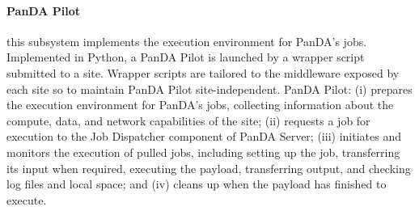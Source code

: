 
\paragraph{\textbf{PanDA Pilot}} this subsystem implements the execution
environment for PanDA's jobs\cite{nilsson2011atlas}. Implemented in Python, a
PanDA Pilot is launched by a wrapper script submitted to a site. Wrapper scripts
are tailored to the middleware exposed by each site so to maintain PanDA Pilot
site-independent. PanDA Pilot: (i) prepares the execution environment for
PanDA's jobs, collecting information about the compute, data, and network
capabilities of the site; (ii) requests a job for execution to the Job
Dispatcher component of PanDA Server; (iii) initiates and monitors the execution
of pulled jobs, including setting up the job, transferring its input when
required, executing the payload, transferring output, and checking log files and
local space; and (iv) cleans up when the payload has finished to execute.




